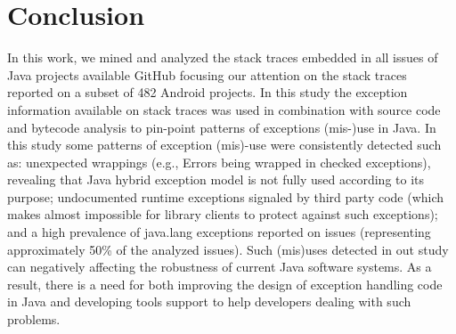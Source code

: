 \documentclass[conference]{IEEEtran}
\begin{document}

\section{Conclusion}

In this work, we mined and analyzed the stack traces embedded in all issues 
of Java projects available GitHub focusing our attention on the stack traces reported on
a subset of 482 Android projects. In this study the exception information available 
on stack traces was used in combination with source code and bytecode analysis to 
pin-point patterns of exceptions (mis-)use in Java. In this study some patterns of exception
(mis)-use were consistently detected such as: unexpected wrappings (e.g., Errors
being wrapped in checked exceptions), revealing that Java hybrid exception
model is not fully used according to its purpose; undocumented runtime
exceptions signaled by third party code (which makes almost impossible for
library clients to protect against such exceptions); and a high prevalence of
java.lang exceptions reported on issues (representing approximately 50\% of the
analyzed issues). Such (mis)uses detected in out study can negatively affecting the 
robustness of current Java software systems.  As a result, there is a need for both 
improving the design of exception handling code in Java 
and developing tools support to help developers dealing with such problems. 
\end{document}
